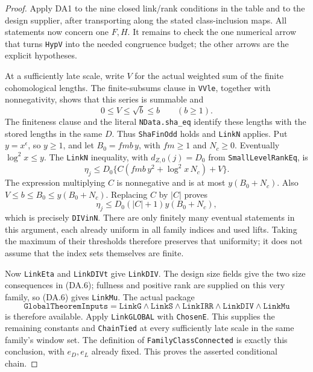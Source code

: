 \begin{proof}
Apply DA1 to the nine closed link/rank conditions in the table and to
the design supplier, after transporting along the stated class-inclusion
maps.  All statements now concern one $F,H$.  It remains to check the
one numerical arrow that turns \texttt{HypV} into the needed
congruence budget; the other arrows are the explicit hypotheses.

At a sufficiently late scale, write $V$ for the actual weighted sum of
the finite cohomological lengths.  The finite-subsums clause in
\texttt{VVle}, together with nonnegativity, shows that this series is
summable and
\[
                     0\le V\le\sqrt b\le b\qquad(b\ge1).
                                                               \tag{DA.7}
\]
The finiteness clause and the literal \texttt{NData.sha\_eq} identify
these lengths with the stored lengths in the same $D$.  Thus
\texttt{ShaFinOdd} holds and \texttt{LinkN} applies.
Put $y=x^\epsilon$, so $y\ge1$, and let
$B_0=fmb\,y$, with $fm\ge1$ and $N_c\ge0$.  Eventually
$\log^2x\le y$.  The \texttt{LinkN} inequality, with
$d_{Z,0}(j)=D_0$ from \texttt{SmallLevelRankEq}, is
\[
 \eta_j\le D_0\{C(fmb\,y^2+\log^2x\,N_c)+V\}.
                                                               \tag{DA.8}
\]
The expression multiplying $C$ is nonnegative and is at most
$y(B_0+N_c)$.  Also $V\le b\le B_0\le y(B_0+N_c)$.
Replacing $C$ by $|C|$ proves
\[
           \eta_j\le D_0(|C|+1)y(B_0+N_c),                \tag{DA.9}
\]
which is precisely \texttt{DIVinN}.  There are only finitely many
eventual statements in this argument, each already uniform in all
family indices and used lifts.  Taking the maximum of their thresholds
therefore preserves that uniformity; it does not assume that the index
sets themselves are finite.

Now \texttt{LinkEta} and \texttt{LinkDIVt} give \texttt{LinkDIV}.
The design size fields give the two size consequences in (DA.6);
fullness and positive rank are supplied on this very family, so (DA.6)
gives \texttt{LinkMu}.  The actual package
\[
 \texttt{GlobalTheoremInputs}
 =\texttt{LinkG}\wedge\texttt{LinkS}\wedge\texttt{LinkIRR}
     \wedge\texttt{LinkDIV}\wedge\texttt{LinkMu}
\]
is therefore available.  Apply \texttt{LinkGLOBAL} with
\texttt{ChosenE}.  This supplies the remaining constants and
\texttt{ChainTied} at every sufficiently late scale in the same
family's window set.  The definition of
\texttt{FamilyClassConnected} is exactly this conclusion, with
$e_D,e_L$ already fixed.  This proves the asserted conditional chain.
\end{proof}

